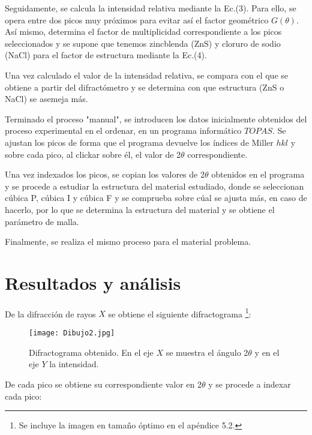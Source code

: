 \documentclass[a4paper,twocolumn,10pt]{article}
\begin{document}
Seguidamente, se calcula la intensidad relativa mediante la Ec.(3). Para ello, se opera entre dos picos muy próximos para evitar así el factor geométrico $G(\theta)$. Así mismo,  determina el factor de multiplicidad correspondiente a los picos seleccionados y se supone que tenemos zincblenda (ZnS) y cloruro de sodio (NaCl) para el factor de estructura mediante la Ec.(4).

Una vez calculado el valor de la intensidad relativa, se compara con el que se obtiene a partir del difractómetro y se determina con que estructura (ZnS o NaCl) se asemeja más.

Terminado el proceso "manual", se introducen los datos inicialmente obtenidos del proceso experimental en el ordenar, en un programa informático $TOPAS$. Se ajustan los picos de forma que el programa devuelve los índices de Miller $hkl$  y sobre cada pico, al clickar sobre él, el valor de 2$\theta$ correspondiente.

Una vez indexados los picos, se copian los valores de 2$\theta$ obtenidos en el programa y se procede a estudiar la estructura del material estudiado, donde se seleccionan cúbica P, cúbica I y cúbica F y se comprueba sobre cúal se ajusta más, en caso de hacerlo, por lo que se determina la estructura del material y se obtiene el parámetro de malla.

Finalmente, se realiza el mismo proceso para el material problema.








\section{Resultados y análisis}

De la difracción de rayos $X$ se obtiene el siguiente difractograma \footnote{Se incluye la imagen en tamaño óptimo en el apéndice 5.2.}:

\begin{figure}[H]
\centering
\texttt{[image: Dibujo2.jpg]}
\caption{Difractograma obtenido. En el eje $X$ se muestra el ángulo 2$\theta$ y en el eje $Y$ la intensidad.} 
\label{Figura 1:Dibujo2}
\end{figure}

De cada pico se obtiene su correspondiente valor en 2$\theta$ y se procede a indexar cada pico:
\end{document}
